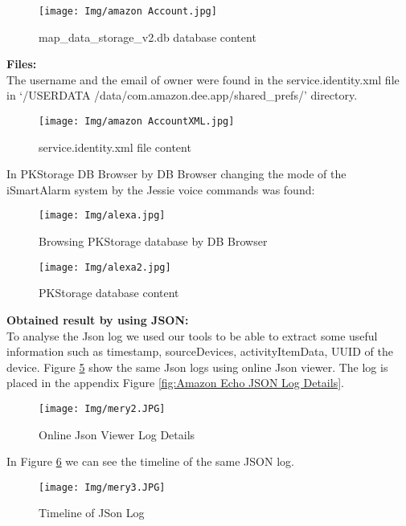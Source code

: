 \documentclass{easychair}
\begin{document}
\begin{figure}[H]
    \centering
    \texttt{[image: Img/amazon Account.jpg]}
    \caption{map\_data\_storage\_v2.db database content}
    \label{fig:my_label}
\end{figure}

\textbf{Files:}\\

The username and the email of owner were found in the service.identity.xml file in ‘/USERDATA /data/com.amazon.dee.app/shared\_prefs/’ directory.\\

\begin{figure}[H]
    \centering
    \texttt{[image: Img/amazon AccountXML.jpg]}
    \caption{service.identity.xml file content}
    \label{fig:my_label}
\end{figure}

In PKStorage DB Browser by DB Browser changing the mode of the iSmartAlarm system by the Jessie voice commands was found:\\
\begin{figure}[H]
    \centering
    \texttt{[image: Img/alexa.jpg]}
    \caption{Browsing PKStorage database by DB Browser}
    \label{fig:my_label}
\end{figure}
\begin{figure}[H]
    \centering
    \texttt{[image: Img/alexa2.jpg]}
    \caption{PKStorage database content}
    \label{fig:my_label}
\end{figure}
\newpage
\textbf{Obtained result by using JSON:}\\
To analyse the Json log we used our tools to be able to extract some useful information such as timestamp, sourceDevices, activityItemData, UUID of the device. Figure \ref{fig:JV} show the same Json logs using online Json viewer. The log is placed in the appendix Figure  \ref{fig:Amazon Echo JSON Log Details}.

\begin{figure}[H]
    \centering
    \texttt{[image: Img/mery2.JPG]}
    \caption{Online Json Viewer Log Details}
    \label{fig:JV}
\end{figure}

In Figure \ref{fig:Timeline of JSon Log} we can see the timeline of the same JSON log.
\begin{figure}[H]
    \centering
    \texttt{[image: Img/mery3.JPG]}
    \caption{Timeline of JSon Log }
    \label{fig:Timeline of JSon Log}
\end{figure}
\end{document}
